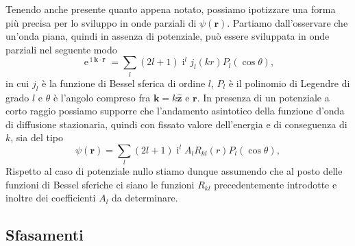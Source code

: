 \documentclass[a4paper,fleqn,twoside,12pt]{article}
\DeclareMathOperator{\e}{\mathrm{e}} %
\DeclareMathOperator{\uimm}{\mathrm{i}} %
\newcommand*{\versor}[1]{\hat{\bm{#1}}}
\begin{document}
Tenendo anche presente quanto appena notato, possiamo ipotizzare una forma più
precisa per lo sviluppo in onde parziali di $\psi(\bm{r})$.  Partiamo
dall'osservare che un'onda piana, quindi in assenza di potenziale, può essere
sviluppata in onde parziali nel seguente modo
\begin{equation}
  \label{eq:sviluppo-onda-piana}
  \e^{\uimm \bm{k}\cdot\bm{r}} = \sum_{l} (2l+1) \uimm^{l} j_{l}(kr)
  P_{l}(\cos\theta),
\end{equation}
in cui $j_{l}$ è la funzione di Bessel sferica di ordine $l$, $P_{l}$ è il
polinomio di Legendre di grado $l$ e $\theta$ è l'angolo compreso fra
$\bm{k} = k\versor{z}$ e $\bm{r}$.  In presenza di un potenziale a corto raggio
possiamo supporre che l'andamento asintotico della funzione d'onda di diffusione
stazionaria, quindi con fissato valore dell'energia e di conseguenza di $k$, sia
del tipo
\begin{equation}
  \label{eq:onde-parziali2}
  \psi(\bm{r}) = \sum_{l} (2l+1) \uimm^{l} A_{l} R_{kl}(r) P_{l}(\cos\theta),
\end{equation}
Rispetto al caso di potenziale nullo stiamo dunque assumendo che al posto delle
funzioni di Bessel sferiche ci siano le funzioni $R_{kl}$ precedentemente
introdotte e inoltre dei coefficienti $A_{l}$ da determinare.

\subsection{Sfasamenti}
\label{sec:sfasamenti}
\end{document}
